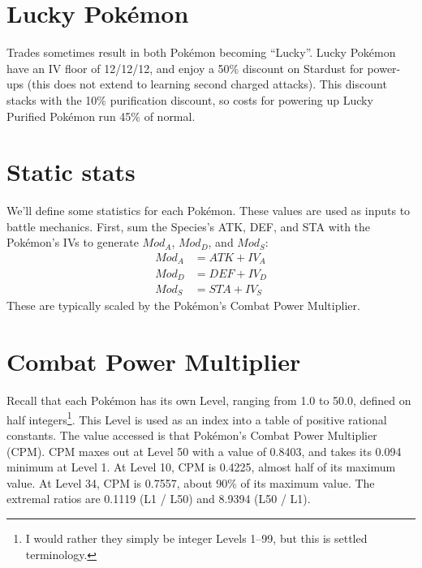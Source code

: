 \section{Lucky Pokémon\label{sec:lucky}}
Trades sometimes result in both Pokémon becoming ``Lucky''.
Lucky Pokémon have an IV floor of 12/12/12, and enjoy a 50\% discount on Stardust for power-ups
  (this does not extend to learning second charged attacks).
This discount stacks with the 10\% purification discount, so costs for
  powering up Lucky Purified Pokémon run 45\% of normal.

\section{Static stats\label{sec:staticstats}}
We'll define some statistics for each Pokémon.
These values are used as inputs to battle mechanics.
First, sum the Species's ATK, DEF, and STA with the Pokémon's
 IVs to generate $Mod_A$, $Mod_D$, and $Mod_S$:
\begin{align*}
   Mod_A &= ATK + IV_A \\
   Mod_D &= DEF + IV_D \\
   Mod_S &= STA + IV_S
\end{align*}
These are typically scaled by the Pokémon's Combat Power Multiplier.
\section{Combat Power Multiplier\label{sec:cpm}}
Recall that each Pokémon has its own Level, ranging from 1.0
 to 50.0, defined on half integers\footnote{I would rather they
 simply be integer Levels 1--99, but this is settled terminology.}.
This Level is used as an index into a table of positive rational constants.
The value accessed is that Pokémon's Combat Power Multiplier (CPM).
CPM maxes out at Level 50 with a value of 0.8403, and takes its 
  0.094 minimum at Level 1.
At Level 10, CPM is 0.4225, almost half of its maximum value.
At Level 34, CPM is 0.7557, about 90\% of its maximum value.
The extremal ratios are 0.1119 (L1 / L50) and 8.9394 (L50 / L1).


